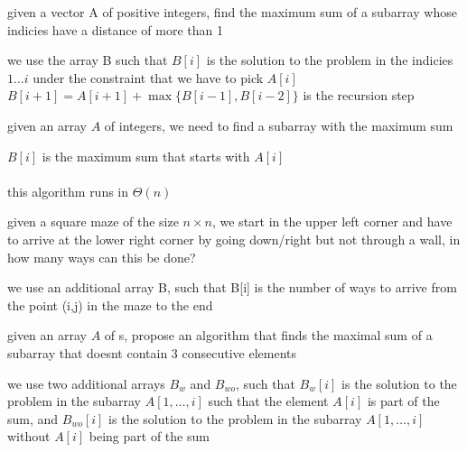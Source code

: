 \documentclass[a4paper,12pt]{article}
\begin{document}
\begin{question}
given a vector A of positive integers, find the maximum sum of a subarray whose indicies have a distance of more than 1\\[0pt]
\begin{answer}
we use the array B such that \(B[i]\) is the solution to the problem in the indicies \(1\dots i\) under the constraint that we have to pick \(A[i]\)\\[0pt]
\(B[i+1] = A[i+1] + \max\{B[i-1],B[i-2]\}\) is the recursion step\\[0pt]
\end{answer}
\end{question}
\begin{question}
given an array \(A\) of integers, we need to find a subarray with the maximum sum\\[0pt]
\begin{answer}
\(B[i]\) is the maximum sum that starts with \(A[i]\)\\[0pt]
\\[0pt]

this algorithm runs in \(\Theta(n)\)\\[0pt]
\end{answer}
\end{question}
\begin{question}
given a square maze of the size \(n \times n\), we start in the upper left corner and have to arrive at the lower right corner by going down/right but not through a wall, in how many ways can this be done?\\[0pt]
\begin{answer}
we use an additional array B, such that B[i] is the number of ways to arrive from the point (i,j) in the maze to the end\\[0pt]
\end{answer}
\end{question}
\begin{question}
given an array \(A\) of s, propose an algorithm that finds the maximal sum of a subarray that doesnt contain 3 consecutive elements\\[0pt]
\begin{answer}
we use two additional arrays \(B_w\) and \(B_{wo}\), such that \(B_w[i]\) is the solution to the problem in the subarray \(A[1,\dots,i]\) such that the element \(A[i]\) is part of the sum, and \(B_{wo}[i]\) is the solution to the problem in the subarray \(A[1,\dots,i]\) without \(A[i]\) being part of the sum\\[0pt]
\\[0pt]
\end{answer}
\label{orgecd6279}
\end{question}
\end{document}
